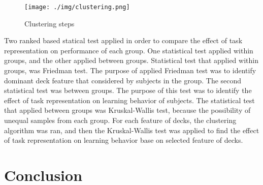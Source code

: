 \documentclass[12pt,twocolumn]{elsarticle}
\begin{document}
\begin{figure*}
\caption{Clustering steps}
\label{fig:clustering}
\centering
\texttt{[image: ./img/clustering.png]}
\end{figure*}

Two ranked based statical test applied
in order to compare the effect of task
representation on performance of each
group. One statistical test applied
within groups, and the other applied
between groups. Statistical test that
applied within groups, was Friedman
test. The purpose of applied Friedman
test was to identify dominant deck
feature that considered by subjects in
the group. The second statistical test
was between groups. The purpose of this
test was to identify the effect of task
representation on learning behavior of
subjects.  The statistical test that
applied between groups was
Kruskal-Wallis test, because the
possibility of unequal samples from each
group. For each feature of decks, the
clustering algorithm was ran, and then
the Kruskal-Wallis test was applied to
find the effect of task representation
on learning behavior base on selected
feature of decks.


% 
\section{Conclusion}
\end{document}

